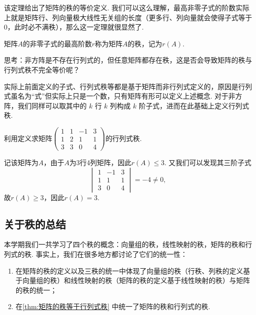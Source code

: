 该定理给出了矩阵的秩的等价定义. 我们可以这么理解，最高非零子式的阶数实际上就是矩阵行、列向量极大线性无关组的长度（更多行、列向量就会使得子式等于0，此时必不满秩），那么这一定理就很显然了.

\begin{definition}{}{}
    矩阵$A$的非零子式的最高阶数$r$称为矩阵$A$的秩，记为$r(A)$.
\end{definition}

思考：非方阵是不存在行列式的，但任意矩阵都存在秩，这是否会导致矩阵的秩与行列式秩不完全等价呢？

实际上前面定义的子式、行列式秩等都是基于矩阵而非行列式定义的，原因是行列式虽名为``式''但实际上只是一个数，只有矩阵有形可以定义上述概念. 对于非方阵，我们同样可以取其中的 $k$ 行 $k$ 列构成 $k$ 阶子式，进而在此基础上定义行列式秩.

\begin{example}{}{}
    利用定义求矩阵$\begin{pmatrix}
            1 & 1 & -1 & 3 \\ 1 & 2 & 1 & 1 \\ 3 & 3 & 0 & 4
        \end{pmatrix}$的行列式秩.
\end{example}

\begin{solution}
    记该矩阵为$A$，由于$A$为3行4列矩阵，因此$r(A)\leqslant 3$. 又我们可以发现其三阶子式
    \[\begin{vmatrix}
            1 & -1 & 3 \\ 1 & 1 & 1 \\ 3 & 0 & 4
        \end{vmatrix}=-4\neq 0,\]
    故$r(A)\geqslant 3$，因此$r(A)=3$.
\end{solution}

\subsection{关于秩的总结}

本学期我们一共学习了四个秩的概念：向量组的秩，线性映射的秩，矩阵的秩和行列式的秩. 事实上，我们在很多地方都讨论了它们的统一性：
\begin{enumerate}
    \item 在矩阵的秩的定义以及三秩的统一中体现了向量组的秩（行秩、列秩的定义基于向量组的秩）和线性映射的秩（矩阵的秩的定义基于线性映射的秩）与矩阵的秩的统一；

    \item 在\autoref{thm:矩阵的秩等于行列式秩} 中统一了矩阵的秩和行列式的秩.
\end{enumerate}


